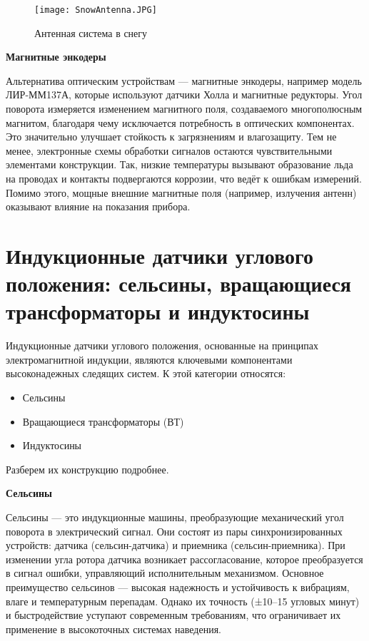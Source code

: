   \begin{figure}[!t]
    \centering
    \texttt{[image: SnowAntenna.JPG]}
    \caption{Антенная система в снегу}
    \label{SnowAntenna}
  \end{figure}

  \textbf{Магнитные энкодеры}
  
  Альтернатива оптическим устройствам — магнитные энкодеры, например модель ЛИР-ММ137А, 
  которые используют датчики Холла и магнитные редукторы. Угол поворота измеряется изменением магнитного поля, создаваемого многополюсным магнитом, 
  благодаря чему исключается потребность в оптических компонентах. 
  Это значительно улучшает стойкость к загрязнениям и влагозащиту. 
  Тем не менее, электронные схемы обработки сигналов остаются чувствительными элементами конструкции. 
  Так, низкие температуры вызывают образование льда на проводах и контакты подвергаются коррозии, что ведёт к ошибкам измерений. 
  Помимо этого, мощные внешние магнитные поля (например, излучения антенн) оказывают влияние на показания прибора.

\section{Индукционные датчики углового положения: сельсины, вращающиеся трансформаторы и индуктосины}

Индукционные датчики углового положения, основанные на принципах электромагнитной индукции, являются ключевыми компонентами высоконадежных следящих систем. 
К этой категории относятся: 
\begin{itemize} 
  \item Сельсины 
  \item Вращающиеся трансформаторы (ВТ) 
  \item Индуктосины 
\end{itemize}

Разберем их конструкцию подробнее.

\textbf{Сельсины}

Сельсины — это индукционные машины, преобразующие механический угол поворота в электрический сигнал. Они состоят из пары синхронизированных устройств: датчика (сельсин-датчика) 
и приемника (сельсин-приемника). При изменении угла ротора датчика возникает рассогласование, которое преобразуется в сигнал ошибки, управляющий исполнительным механизмом.
Основное преимущество сельсинов — высокая надежность и устойчивость к вибрациям, влаге и температурным перепадам. Однако их точность (±10–15 угловых минут) 
и быстродействие уступают современным требованиям, что ограничивает их применение в высокоточных системах наведения.

